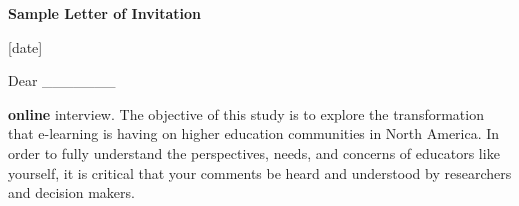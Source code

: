 \documentclass[a4paper]{book}
\begin{document}
\begin{addmargin}{2em}

\begin{flushleft}
\vspace{5mm}
\begin{center}
\textbf{{\small \textsf{Sample Letter of Invitation}}}
\end{center}
\end{flushleft}



\begin{flushleft}
{\small \textsf{[date]}}
\end{flushleft}


\begin{flushleft}
{\small \textsf{Dear \_\_\_\_\_\_\_}}
\end{flushleft}



\begin{spacing}{1.00}
\textbf{{\small \textsf{online }}}{\small \textsf{interview. The objective of this study is to explore the transformation that e-learning is having on higher education communities in North America. In order to fully understand the perspectives, needs, and concerns of educators like yourself, it is critical that your comments be heard and understood by researchers and decision makers.}}

\vspace{5mm}
\end{spacing}

\end{addmargin}
\end{document}
